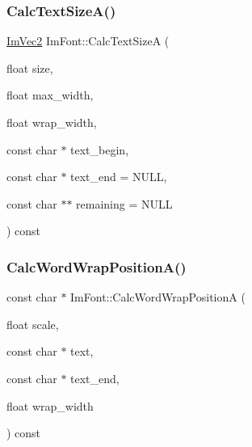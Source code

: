 \hypertarget{struct_im_font_ad67f64fd206ad197f4b93b1a1ae27cfe}{}\label{struct_im_font_ad67f64fd206ad197f4b93b1a1ae27cfe} 
\subsubsection{\texorpdfstring{Calc\+Text\+Size\+A()}{CalcTextSizeA()}}
{\footnotesize\ttfamily \hyperlink{struct_im_vec2}{Im\+Vec2} Im\+Font\+::\+Calc\+Text\+SizeA (\begin{DoxyParamCaption}\item[{float}]{size,  }\item[{float}]{max\+\_\+width,  }\item[{float}]{wrap\+\_\+width,  }\item[{const char $\ast$}]{text\+\_\+begin,  }\item[{const char $\ast$}]{text\+\_\+end = {\ttfamily NULL},  }\item[{const char $\ast$$\ast$}]{remaining = {\ttfamily NULL} }\end{DoxyParamCaption}) const}

\hypertarget{struct_im_font_a3781bb82a1ceba919cb6c98a398c7a67}{}\label{struct_im_font_a3781bb82a1ceba919cb6c98a398c7a67} 
\subsubsection{\texorpdfstring{Calc\+Word\+Wrap\+Position\+A()}{CalcWordWrapPositionA()}}
{\footnotesize\ttfamily const char $\ast$ Im\+Font\+::\+Calc\+Word\+Wrap\+PositionA (\begin{DoxyParamCaption}\item[{float}]{scale,  }\item[{const char $\ast$}]{text,  }\item[{const char $\ast$}]{text\+\_\+end,  }\item[{float}]{wrap\+\_\+width }\end{DoxyParamCaption}) const}

\hypertarget{struct_im_font_aecf7773b1c40b433f91ee245f463de12}{}\label{struct_im_font_aecf7773b1c40b433f91ee245f463de12} 

